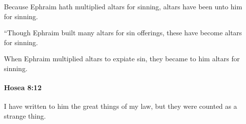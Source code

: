 			\begin{versebox}
					\item[BHS] 
					\item[LXX] 
					\item[ASV] Because Ephraim hath multiplied altars for sinning, altars have been unto him for sinning.
					\item[NIV] “Though Ephraim built many altars for sin offerings, these have become altars for sinning.
					\item[NRSV] When Ephraim multiplied altars to expiate sin, they became to him altars for sinning.
			\end{versebox}

		\paragraph{Hosea 8:12} %
			\label{HOSEA-8-12}

			I have written to him the great things of my law, but they were counted as a strange thing.

